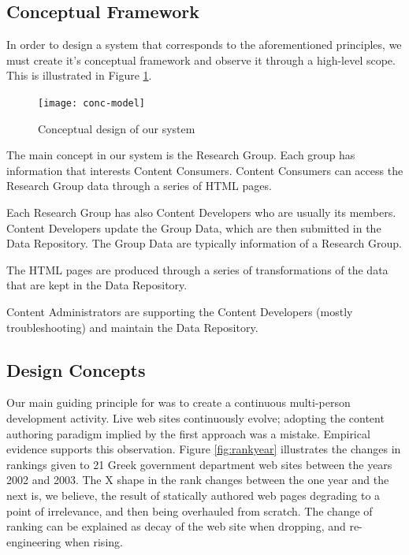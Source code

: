 \documentclass[10pt]{article}
\begin{document}
\subsection{Conceptual Framework}

In order to design a system that corresponds to the aforementioned principles, 
we must create it's conceptual framework and observe it through a high-level
scope. This is illustrated in Figure \ref{fig:conc-model}.

\begin{figure}[h!]
\begin{center}
\texttt{[image: conc-model]}
\end{center}
\caption{Conceptual design of our system}
\label{fig:conc-model}
\end{figure}

The main concept in our system is the Research Group. Each group has 
information that interests Content Consumers. Content Consumers 
can access the Research Group data through a series of HTML pages.

Each Research Group has also Content Developers who are usually its members.
Content Developers update the Group Data, which are then submitted in the 
Data Repository. The Group Data are typically information of a Research Group.

The HTML pages are produced through a series of transformations of the data that
are kept in the Data Repository.

Content Administrators are supporting the Content Developers (mostly troubleshooting) 
and maintain the Data Repository.

\subsection{Design Concepts}

Our main guiding principle for was to create a continuous multi-person 
development activity.
Live web sites continuously evolve;
adopting the content authoring paradigm implied
by the first approach was a mistake.
Empirical evidence supports this observation.
Figure \ref{fig:rankyear} illustrates the changes
in rankings given to 21 Greek government department
web sites between the years 2002 and 2003.
The X shape in the rank changes between the one year and the next
is, we believe, the result of statically authored web pages
degrading to a point of irrelevance, and then being overhauled
from scratch. The change of ranking can be explained as decay of the web site when dropping,
and re-engineering when rising.
\end{document}
